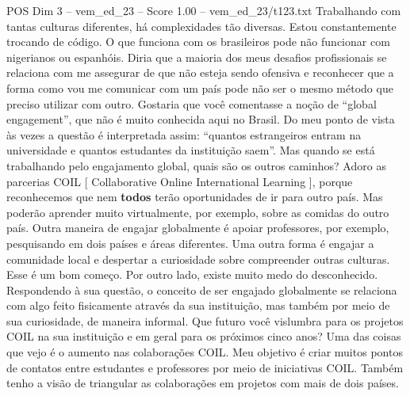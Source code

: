 \begin{textsample}{POS Dim 3 – vem\_ed\_23 – Score 1.00 – vem\_ed\_23/t123.txt}
Trabalhando com tantas culturas diferentes, há complexidades tão diversas.
Estou constantemente trocando de código.
O que funciona com os brasileiros pode não funcionar com nigerianos ou espanhóis.
Diria que a maioria dos meus desafios profissionais se relaciona com me assegurar de que não esteja sendo ofensiva e reconhecer que a forma como vou me comunicar com um país pode não ser o mesmo método que preciso utilizar com outro.
Gostaria que você comentasse a noção de “global engagement”, que não é muito conhecida aqui no Brasil.
Do meu ponto de vista às vezes a questão é interpretada assim: “quantos estrangeiros entram na universidade e quantos estudantes da instituição saem”.
Mas quando se está trabalhando pelo engajamento global, quais são os outros caminhos?
Adoro as parcerias COIL [ Collaborative Online International Learning ], porque reconhecemos que nem \textbf{todos} terão oportunidades de ir para outro país.
Mas poderão aprender muito virtualmente, por exemplo, sobre as comidas do outro país.
Outra maneira de engajar globalmente é apoiar professores, por exemplo, pesquisando em dois países e áreas diferentes.
Uma outra forma é engajar a comunidade local e despertar a curiosidade sobre compreender outras culturas.
Esse é um bom começo.
Por outro lado, existe muito medo do desconhecido.
Respondendo à sua questão, o conceito de ser engajado globalmente se relaciona com algo feito fisicamente através da sua instituição, mas também por meio de sua curiosidade, de maneira informal.
Que futuro você vislumbra para os projetos COIL na sua instituição e em geral para os próximos cinco anos?
Uma das coisas que vejo é o aumento nas colaborações COIL.
Meu objetivo é criar muitos pontos de contatos entre estudantes e professores por meio de iniciativas COIL.
Também tenho a visão de triangular as colaborações em projetos com mais de dois países.

\end{textsample}
